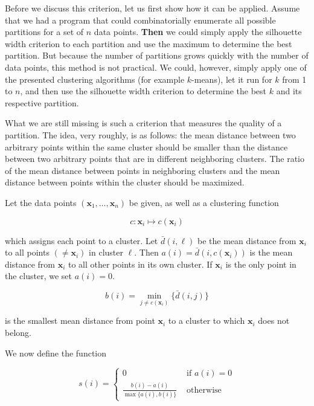 \documentclass[10pt]{book}
\begin{document}
Before we discuss this criterion, let us first show how it can be applied. Assume that we had a program that could combinatorially enumerate all possible partitions for a set of $n$ data points. \textbf{Then} we could simply apply the silhouette width criterion to each partition and use the maximum to determine the best partition. But because the number of partitions grows quickly with the number of data points, this method is not practical. We could, however, simply apply one of the presented clustering algorithms (for example $k$-means), let it run for $k$ from 1 to $n$, and then use the silhouette width criterion to determine the best $k$ and its respective partition.

What we are still missing is such a criterion that measures the quality of a partition. The idea, very roughly, is as follows: the mean distance between two arbitrary points within the same cluster should be smaller than the distance between two arbitrary points that are in different neighboring clusters. The ratio of the mean distance between points in neighboring clusters and the mean distance between points within the cluster should be maximized.

Let the data points $\left(\boldsymbol{x}_{1}, \ldots, \boldsymbol{x}_{n}\right)$ be given, as well as a clustering function

$$
c: \boldsymbol{x}_{i} \mapsto c\left(\boldsymbol{x}_{i}\right)
$$

which assigns each point to a cluster. Let $\bar{d}(i, \ell)$ be the mean distance from $\boldsymbol{x}_{i}$ to all points $\left(\neq \boldsymbol{x}_{i}\right)$ in cluster $\ell$. Then $a(i)=\bar{d}\left(i, c\left(\boldsymbol{x}_{i}\right)\right)$ is the mean distance from $\boldsymbol{x}_{i}$ to all other points in its own cluster. If $\boldsymbol{x}_{i}$ is the only point in the cluster, we set $a(i)=0$.

$$
b(i)=\min _{j \neq c\left(\boldsymbol{x}_{i}\right)}\{\bar{d}(i, j)\}
$$

is the smallest mean distance from point $\boldsymbol{x}_{i}$ to a cluster to which $\boldsymbol{x}_{i}$ does not belong.

We now define the function

$$
s(i)=\left\{\begin{array}{cc}
0 & \text { if } a(i)=0 \\
\frac{b(i)-a(i)}{\max \{a(i), b(i)\}} & \text { otherwise }
\end{array}\right.
$$
\end{document}
